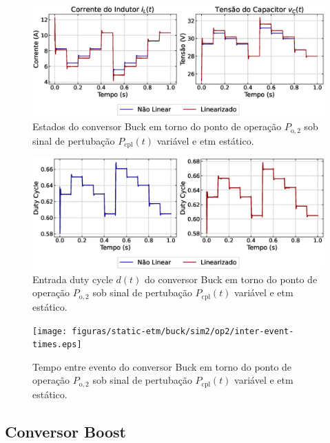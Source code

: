 
\begin{figure}[H]
  \centering
  \captionsetup{justification=centering}
  \includegraphics[width=1.\textwidth]{figuras/static-etm/buck/sim2/op2/result.eps}
  \caption{Estados do conversor Buck em torno do ponto de operação $P_{\mathrm{o}, 2}$ sob sinal de pertubação $P_{\mathrm{cpl}}(t)$ variável e \acrshort{etm} estático.}
\end{figure}

\begin{figure}[H]
  \centering
  \captionsetup{justification=centering}
  \includegraphics[width=1.\textwidth]{figuras/static-etm/buck/sim2/op2/duty-cycle.eps}
  \caption{Entrada duty cycle $d(t)$ do conversor Buck em torno do ponto de operação $P_{\mathrm{o}, 2}$ sob sinal de pertubação $P_{\mathrm{cpl}}(t)$ variável e \acrshort{etm} estático.}
\end{figure}

\begin{figure}[H]
  \centering
  \captionsetup{justification=centering}
  \texttt{[image: figuras/static-etm/buck/sim2/op2/inter-event-times.eps]}
  \caption{Tempo entre evento do conversor Buck em torno do ponto de operação $P_{\mathrm{o}, 2}$ sob sinal de pertubação $P_{\mathrm{cpl}}(t)$ variável e \acrshort{etm} estático.}
\end{figure}

\subsection{Conversor Boost}
